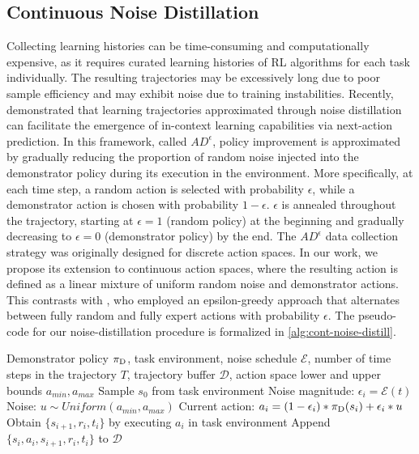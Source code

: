 \documentclass{article}
\theoremstyle{plain}
\theoremstyle{definition}
\theoremstyle{remark}
\begin{document}
\subsection{Continuous Noise Distillation}
\label{subsec:cnd}
Collecting learning histories can be time-consuming and computationally expensive, as it requires curated learning histories of RL algorithms for each task individually. The resulting trajectories may be excessively long due to poor sample efficiency and may exhibit noise due to training instabilities. Recently, \citet{zisman2024emergenceincontextreinforcementlearning} demonstrated that learning trajectories approximated through noise distillation can facilitate the emergence of in-context learning capabilities via next-action prediction. In this framework, called $AD^\epsilon$, policy improvement is approximated by gradually reducing the proportion of random noise injected into the demonstrator policy during its execution in the environment. More specifically, at each time step, a random action is selected with probability
$\epsilon$, while a demonstrator action is chosen with probability $1-\epsilon$. $\epsilon$ is annealed throughout the trajectory, starting at
$\epsilon = 1$ (random policy) at the beginning and gradually decreasing to
$\epsilon = 0$ (demonstrator policy) by the end.
The $AD^\epsilon$ data collection strategy was originally designed for discrete action spaces. In our work, we propose its extension to continuous action spaces, where the resulting action is defined as a linear mixture of uniform random noise and demonstrator actions. This contrasts with \citet{brown2019betterthandemonstratorimitationlearningautomaticallyranked}, who employed an epsilon-greedy approach that alternates between fully random and fully expert actions with probability $\epsilon$. The pseudo-code for our noise-distillation procedure is formalized in \cref{alg:cont-noise-distill}.
 \begin{algorithm}[]
 \caption{Noise distillation for continuous action spaces}
 \label{alg:cont-noise-distill}
 \begin{algorithmic}[1]
     \REQUIRE Demonstrator policy $\pi_{\rm D}$, task environment, noise schedule $\mathcal{E}$, number of time steps in the trajectory $T$, trajectory buffer $\mathcal{D}$, action space lower and upper bounds $a_{min}, a_{max}$
     \STATE Sample $s_0$ from task environment
            \STATE Noise magnitude: $\epsilon_i = \mathcal{E}(t)$
            \STATE Noise: $u \sim Uniform(a_{min}, a_{max})$
 		\STATE Current action: $a_i = (1-\epsilon_i)*\pi_{\rm D}(s_i) + \epsilon_i
        * u$
            \STATE Obtain $\{s_{i+1}, r_{i}, t_i\}$ by executing $a_i$ in task environment
            \STATE Append $\{s_i, a_i, s_{i+1}, r_{i}, t_i\}$ to $\mathcal{D}$
 	\ENDFOR
 \end{algorithmic}
 \end{algorithm}
\end{document}
